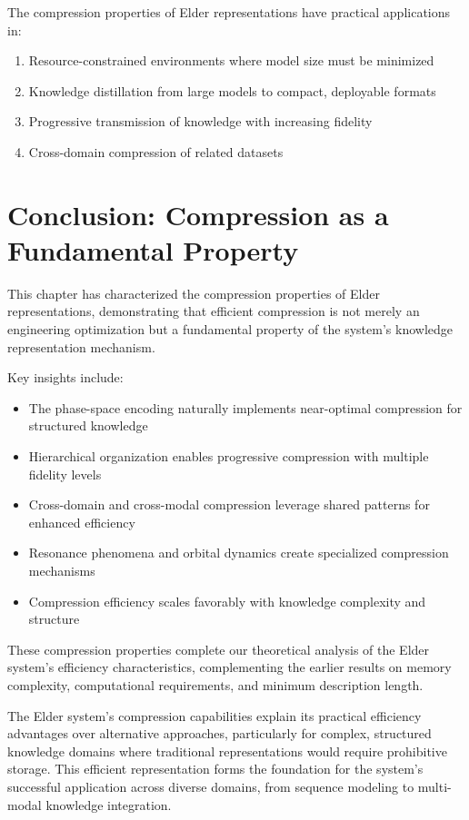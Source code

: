The compression properties of Elder representations have practical applications in:

\begin{enumerate}
    \item Resource-constrained environments where model size must be minimized
    \item Knowledge distillation from large models to compact, deployable formats
    \item Progressive transmission of knowledge with increasing fidelity
    \item Cross-domain compression of related datasets
\end{enumerate}

\section{Conclusion: Compression as a Fundamental Property}

This chapter has characterized the compression properties of Elder representations, demonstrating that efficient compression is not merely an engineering optimization but a fundamental property of the system's knowledge representation mechanism.

Key insights include:
\begin{itemize}
    \item The phase-space encoding naturally implements near-optimal compression for structured knowledge
    \item Hierarchical organization enables progressive compression with multiple fidelity levels
    \item Cross-domain and cross-modal compression leverage shared patterns for enhanced efficiency
    \item Resonance phenomena and orbital dynamics create specialized compression mechanisms
    \item Compression efficiency scales favorably with knowledge complexity and structure
\end{itemize}

These compression properties complete our theoretical analysis of the Elder system's efficiency characteristics, complementing the earlier results on memory complexity, computational requirements, and minimum description length.

The Elder system's compression capabilities explain its practical efficiency advantages over alternative approaches, particularly for complex, structured knowledge domains where traditional representations would require prohibitive storage. This efficient representation forms the foundation for the system's successful application across diverse domains, from sequence modeling to multi-modal knowledge integration.
